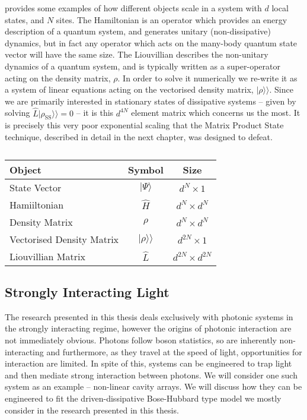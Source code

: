  provides some examples of how different objects scale in a system with \(d\) local states, and \(N\) sites. The Hamiltonian is an operator which provides an energy description of a quantum system, and generates unitary (non-dissipative) dynamics, but in fact any operator which acts on the many-body quantum state vector will have the same size. The Liouvillian describes the non-unitary dynamics of a quantum system, and is typically written as a super-operator acting on the density matrix, \(\rho\). In order to solve it numerically we re-write it as a system of linear equations acting on the vectorised density matrix, \(|\rho\rangle\rangle\). Since we are primarily interested in stationary states of dissipative systems -- given by solving \(\hat{L}|\rho_{\mathrm{SS}}\rangle\rangle = 0\) -- it is this \(d^{4N}\) element matrix which concerns us the most. It is precisely this very poor exponential scaling that the Matrix Product State technique, described in detail in the next chapter, was designed to defeat. 

\begin{table}[hb!]
	\centering
	\begin{tabu}{lcc}
		\hline
		Object & Symbol & Size \\
		\hline
		State Vector & \(|\Psi\rangle\) & \(d^{N} \times 1\) \\
		Hamiiltonian & \(\hat{H}\) & \(d^{N} \times d^{N}\) \\
		Density Matrix & \(\rho\) & \(d^{N} \times d^{N}\) \\
		Vectorised Density Matrix & \(|\rho \rangle\rangle\) & \(d^{2N} \times 1\) \\
		Liouvillian Matrix & \(\hat{L}\) & \(d^{2N} \times d^{2N}\)
	\end{tabu}
	\caption{\label{tab:mbq1-1}}
\end{table}

\FloatBarrier
\subsection{Strongly Interacting Light}
The research presented in this thesis deals exclusively with photonic systems in the strongly interacting regime, however the origins of photonic interaction are not immediately obvious. Photons follow boson statistics, so are inherently non-interacting and furthermore, as they travel at the speed of light, opportunities for interaction are limited. In spite of this, systems can be engineered to trap light and then mediate strong interaction between photons. We will consider one such system as an example -- non-linear cavity arrays. We will discuss how they can be engineered to fit the driven-dissipative Bose-Hubbard type model we mostly consider in the research presented in this thesis. 


